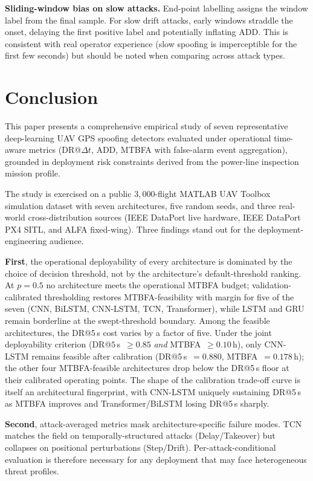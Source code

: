 \documentclass{ieeeaccess}
\begin{document}
\textbf{Sliding-window bias on slow attacks.}
End-point labelling assigns the window label from the final sample.
For slow drift attacks, early windows straddle the onset, delaying the
first positive label and potentially inflating ADD. This is consistent
with real operator experience (slow spoofing is imperceptible for the
first few seconds) but should be noted when comparing across attack types.

\section{Conclusion}

This paper presents a comprehensive empirical study of seven representative
deep-learning UAV GPS spoofing detectors evaluated under operational
time-aware metrics (DR@$\Delta t$, ADD, MTBFA with false-alarm event
aggregation), grounded in deployment risk constraints derived from the
power-line inspection mission profile.

The study is exercised on a public $3{,}000$-flight MATLAB UAV Toolbox
simulation dataset with seven architectures, five random seeds, and
three real-world cross-distribution sources (IEEE DataPort live hardware,
IEEE DataPort PX4 SITL, and ALFA fixed-wing). Three findings stand out
for the deployment-engineering audience.

\textbf{First}, the operational deployability of every architecture is
dominated by the choice of decision threshold, not by the architecture's
default-threshold ranking. At $p=0.5$ no architecture meets the
operational MTBFA budget; validation-calibrated thresholding restores
MTBFA-feasibility with margin for five of the seven (CNN, BiLSTM,
CNN-LSTM, TCN, Transformer), while LSTM and GRU remain borderline at
the swept-threshold boundary. Among the feasible architectures, the
DR@5\,s cost varies by a factor of five. Under the joint deployability
criterion (DR@$5\,$s~$\geq 0.85$ \emph{and} MTBFA~$\geq 0.10$\,h), only
CNN-LSTM remains feasible after calibration (DR@5\,s~$=0.880$,
MTBFA~$=0.178$\,h); the other four MTBFA-feasible architectures drop
below the DR@5\,s floor at their calibrated operating points. The shape
of the calibration trade-off curve is itself an architectural fingerprint,
with CNN-LSTM uniquely sustaining DR@5\,s as MTBFA improves and
Transformer/BiLSTM losing DR@5\,s sharply.

\textbf{Second}, attack-averaged metrics mask architecture-specific
failure modes. TCN matches the field on temporally-structured attacks
(Delay/Takeover) but collapses on positional perturbations (Step/Drift).
Per-attack-conditional evaluation is therefore necessary for any
deployment that may face heterogeneous threat profiles.
\end{document}
